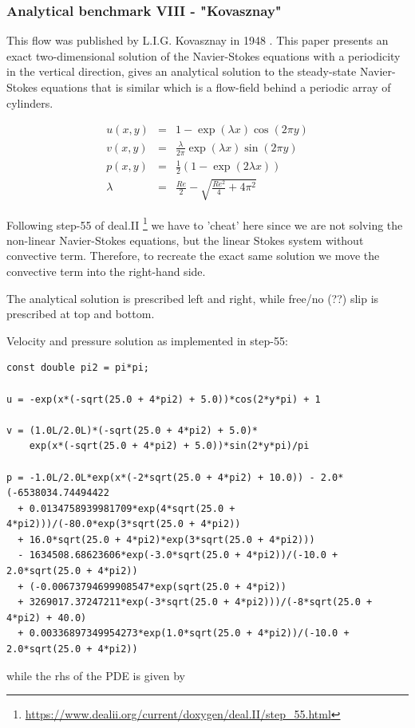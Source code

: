 \bscthesis {}

\subsubsection{Analytical benchmark VIII \label{mms8} - "Kovasznay"}

This flow was published by L.I.G. Kovasznay in 1948 \cite{kova48}. 
This paper presents an exact two-dimensional solution of the Navier-Stokes equations 
with a periodicity in the vertical direction, 
gives an analytical solution to the steady-state Navier-Stokes equations that is similar
which is a flow-field behind a periodic array of cylinders.

\begin{eqnarray}
u(x,y)&=&1-\exp(\lambda x) \cos (2\pi y)\\
v(x,y)&=&\frac{\lambda}{2\pi} \exp(\lambda x) \sin (2 \pi y)\\
p(x,y) &=& \frac{1}{2}(1-\exp (2\lambda x)) \\
\lambda&=&\frac{Re}{2}-\sqrt{\frac{Re^2}{4}+4\pi^2} 
\end{eqnarray}

Following step-55 of deal.II \footnote{\url{https://www.dealii.org/current/doxygen/deal.II/step_55.html}}
we have to 'cheat' here since we are not solving the non-linear Navier-Stokes equations, but the linear Stokes system without convective term. Therefore, to recreate the exact same solution
we move the convective term into the right-hand side.

The analytical solution is prescribed left and right, while free/no (??) slip is prescribed at top and bottom.

Velocity and pressure solution as implemented in step-55:
\begin{lstlisting}
const double pi2 = pi*pi;

u = -exp(x*(-sqrt(25.0 + 4*pi2) + 5.0))*cos(2*y*pi) + 1

v = (1.0L/2.0L)*(-sqrt(25.0 + 4*pi2) + 5.0)*
    exp(x*(-sqrt(25.0 + 4*pi2) + 5.0))*sin(2*y*pi)/pi

p = -1.0L/2.0L*exp(x*(-2*sqrt(25.0 + 4*pi2) + 10.0)) - 2.0*(-6538034.74494422 
  + 0.0134758939981709*exp(4*sqrt(25.0 + 4*pi2)))/(-80.0*exp(3*sqrt(25.0 + 4*pi2)) 
  + 16.0*sqrt(25.0 + 4*pi2)*exp(3*sqrt(25.0 + 4*pi2))) 
  - 1634508.68623606*exp(-3.0*sqrt(25.0 + 4*pi2))/(-10.0 + 2.0*sqrt(25.0 + 4*pi2)) 
  + (-0.00673794699908547*exp(sqrt(25.0 + 4*pi2)) 
  + 3269017.37247211*exp(-3*sqrt(25.0 + 4*pi2)))/(-8*sqrt(25.0 + 4*pi2) + 40.0) 
  + 0.00336897349954273*exp(1.0*sqrt(25.0 + 4*pi2))/(-10.0 + 2.0*sqrt(25.0 + 4*pi2))
\end{lstlisting}
while the rhs of the PDE is given by


